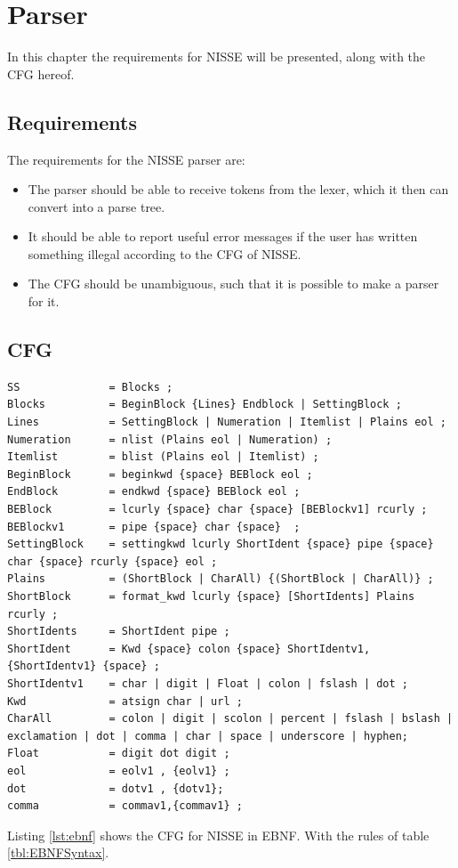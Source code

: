 \chapter{Parser}

In this chapter the requirements for NISSE will be presented, along with the CFG hereof.

\section{Requirements}
The requirements for the NISSE parser are:
\begin{itemize}
	\item The parser should be able to receive tokens from the lexer, which it then can convert into a parse tree.
	\item It should be able to report useful error messages if the user has written something illegal according to the CFG of NISSE.
	\item The CFG should be unambiguous, such that it is possible to make a parser for it. 
\end{itemize}

\newpage
\section{CFG}
\begin{lstlisting}[frame=single, caption={CFG of NISSE in EBNF.}, label={lst:ebnf}, language=NISSE]
SS              = Blocks ;
Blocks          = BeginBlock {Lines} Endblock | SettingBlock ;
Lines           = SettingBlock | Numeration | Itemlist | Plains eol ;
Numeration      = nlist (Plains eol | Numeration) ;
Itemlist        = blist (Plains eol | Itemlist) ;
BeginBlock      = beginkwd {space} BEBlock eol ;
EndBlock        = endkwd {space} BEBlock eol ;
BEBlock         = lcurly {space} char {space} [BEBlockv1] rcurly ;
BEBlockv1       = pipe {space} char {space}  ;
SettingBlock    = settingkwd lcurly ShortIdent {space} pipe {space} char {space} rcurly {space} eol ;
Plains          = (ShortBlock | CharAll) {(ShortBlock | CharAll)} ;
ShortBlock      = format_kwd lcurly {space} [ShortIdents] Plains rcurly ;
ShortIdents     = ShortIdent pipe ;
ShortIdent      = Kwd {space} colon {space} ShortIdentv1,{ShortIdentv1} {space} ;
ShortIdentv1    = char | digit | Float | colon | fslash | dot ;
Kwd             = atsign char | url ;
CharAll         = colon | digit | scolon | percent | fslash | bslash | exclamation | dot | comma | char | space | underscore | hyphen;
Float           = digit dot digit ; 
eol             = eolv1 , {eolv1} ;
dot             = dotv1 , {dotv1};
comma           = commav1,{commav1} ;
\end{lstlisting}
Listing \ref{lst:ebnf} shows the CFG for NISSE in EBNF. With the rules of table \ref{tbl:EBNFSyntax}.

